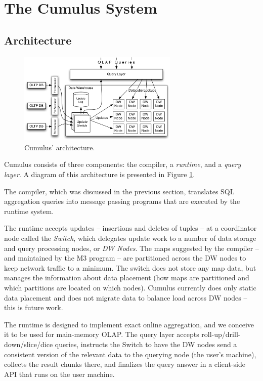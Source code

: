 
\section{The Cumulus System}
\label{sec:architecture}


\subsection{Architecture}


\begin{figure}
\begin{center}
\includegraphics[width=3in]{images/Architecture.pdf}
\caption{Cumulus' architecture.}
\label{fig:arch}
\end{center}
\end{figure}


Cumulus consists of three components: the compiler,
a {\em runtime}, and a {\em query layer}.
A diagram of this architecture is presented in Figure \ref{fig:arch}.

The compiler, which was discussed in the
previous section, translates SQL aggregation queries
into message passing programs that are executed by the runtime system.

The runtime accepts updates -- insertions and deletes of tuples --
at a coordinator node called the \textit{Switch}, which delegates
update work to a number of data storage and query processing nodes, or
\textit{DW Nodes}.
The maps suggested by the compiler -- and maintained by the M3 program --
are partitioned across the DW nodes to keep network traffic to a minimum.  
The switch does not store any map data, but manages
the information about data placement (how maps are partitioned and which
partitions are located on which nodes).
Cumulus currently does only static data placement and does not migrate
data to balance load across DW nodes -- this is future work.

The runtime is designed to implement exact online aggregation, and
we conceive it to be used for main-memory OLAP.
The query layer accepts roll-up/drill-down/slice/dice queries,
instructs the Switch to have the DW nodes send a consistent version of
the relevant data to the querying node (the user's machine),
collects the result chunks there, and
finalizes the query answer
in a client-side API that runs on the user machine.

